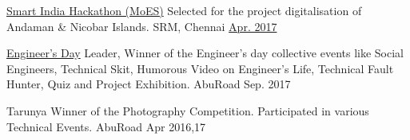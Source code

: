 \begin{cvhonors}
  \cvhonor
    {\href{https://drive.google.com/file/d/1fvv7lMfpzCRUohSPCJd6jZ30_8Or_YJQ/view?usp=sharing}{Smart India Hackathon (MoES)} } %
    {Selected for the project digitalisation of Andaman \& Nicobar Islands. } %
    {SRM, Chennai} %
    {\href{https://innovate.mygov.in/sih2017/}{Apr. 2017}} %

\end{cvhonors}




\begin{cvhonors}

  \cvhonor
	{\href{https://www.facebook.com/citabuinfo/posts/1229195450520361}{Engineer's Day}}%
	{Leader, Winner of the Engineer's day collective events like Social Engineers, Technical Skit, Humorous Video on Engineer’s Life, Technical Fault Hunter, Quiz and Project Exhibition.} %
	{AbuRoad} %
	{Sep. 2017} %
	
  \cvhonor
	{Tarunya} %
	{Winner of the Photography Competition. Participated in various Technical Events.} %
	{AbuRoad} %
	{Apr 2016,17} %

\end{cvhonors}
